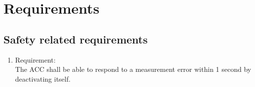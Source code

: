 \section{Requirements}
\label{chapter6}

\subsection{Safety related requirements}

 \begin{enumerate}[label*=\arabic*.]
 	\item \label{req.1}  Requirement: \\
	 	The ACC shall be able to respond to a measurement error within 1 second by deactivating itself.  \\


\end{enumerate}
